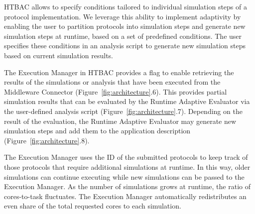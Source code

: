 HTBAC allows to specify conditions tailored to individual simulation steps of
a protocol implementation. We leverage this ability to implement adaptivity
by enabling the user to partition protocols into simulation steps and
generate new simulation steps at runtime, based on a set of predefined
conditions. The user specifies these conditions in an analysis script to
generate new simulation steps based on current simulation results.

The Execution Manager in HTBAC provides a flag to enable retrieving the
results of the simulations or analysis that have been executed from the
Middleware Connector (Figure~\ref{fig:architecture}.6). This provides partial
simulation results that can be evaluated by the Runtime Adaptive Evaluator
via the user-defined analysis script (Figure~\ref{fig:architecture}.7).
Depending on the result of the evaluation, the Runtime Adaptive Evaluator may
generate new simulation steps and add them to the application description
(Figure~\ref{fig:architecture}.8).

The Execution Manager uses the ID of the submitted protocols to keep track of
those protocols that require additional simulations at runtime. In this way,
older simulations can continue executing while new simulations can be passed
to the Execution Manager. As the number of simulations grows at runtime, the
ratio of cores-to-task fluctuates. The Execution Manager automatically
redistributes an even share of the total requested cores to each simulation.






